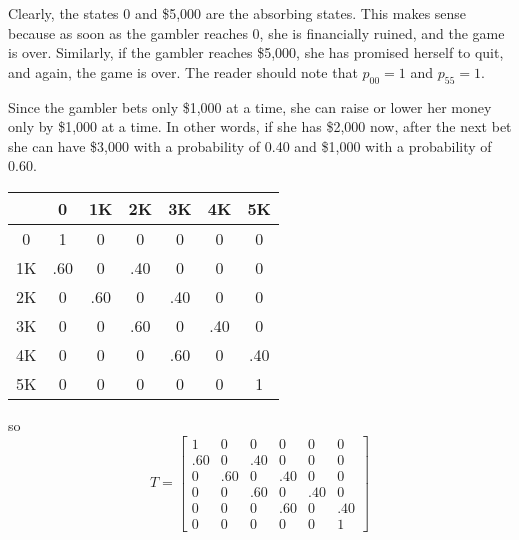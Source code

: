 Clearly, the states 0 and \$5,000 are the absorbing states. This makes sense because as soon as the gambler reaches 0, she is financially ruined, and the game is over. Similarly, if the gambler reaches \$5,000, she has promised herself to quit, and again, the game is over. The reader should note that \( p_{00} = 1 \) and \( p_{55} = 1 \).

Since the gambler bets only \$1,000 at a time, she can raise or lower her money only by \$1,000 at a time. In other words, if she has \$2,000 now, after the next bet she can have \$3,000 with a probability of 0.40 and \$1,000 with a probability of 0.60.
\begin{center}
    \begin{tabular}{c|cccccc}
           & 0   & 1K  & 2K  & 3K  & 4K  & 5K  \\
        \hline
        0  & 1   & 0   & 0   & 0   & 0   & 0   \\
        1K & .60 & 0   & .40 & 0   & 0   & 0   \\
        2K & 0   & .60 & 0   & .40 & 0   & 0   \\
        3K & 0   & 0   & .60 & 0   & .40 & 0   \\
        4K & 0   & 0   & 0   & .60 & 0   & .40 \\
        5K & 0   & 0   & 0   & 0   & 0   & 1
    \end{tabular}
\end{center}
so
\[
    T= \begin{bmatrix}
        1   & 0   & 0   & 0   & 0   & 0   \\
        .60 & 0   & .40 & 0   & 0   & 0   \\
        0   & .60 & 0   & .40 & 0   & 0   \\
        0   & 0   & .60 & 0   & .40 & 0   \\
        0   & 0   & 0   & .60 & 0   & .40 \\
        0   & 0   & 0   & 0   & 0   & 1
    \end{bmatrix}
\]


